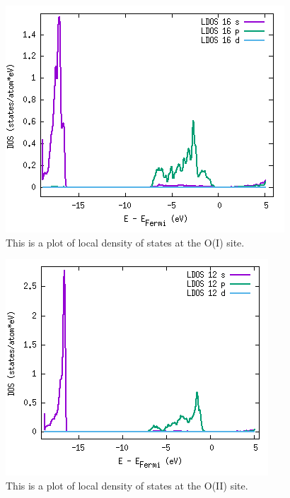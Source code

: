 \begin{figure}[H]
\includegraphics[width=\linewidth]{../fig/dosplot/ldos_O_I}\caption{This is a plot of local density of states at the O(I) site.}\label{fig:ldos_O_I}
\end{figure}

\begin{figure}[H]
\includegraphics[width=\linewidth]{../fig/dosplot/ldos_O_II}\caption{This is a plot of local density of states at the O(II) site.}\label{fig:ldos_O_II}
\end{figure}


